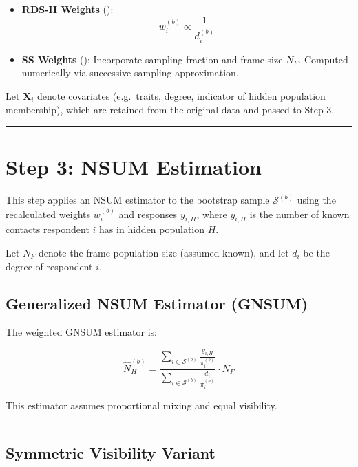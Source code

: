 \documentclass[
  12pt,
  letterpaper,
  DIV=11,
  numbers=noendperiod]{scrartcl}
\theoremstyle{plain}
\theoremstyle{definition}
\begin{document}
\begin{itemize}
\item
  \textbf{RDS-II Weights} (\textcite{volz08-simple}): \[
  w_i^{(b)} \propto \frac{1}{d_i^{(b)}}
  \]
\item
  \textbf{SS Weights} (\textcite{gile11-improv}): Incorporate sampling
  fraction and frame size \(N_F\). Computed numerically via successive
  sampling approximation.
\end{itemize}

Let \(\mathbf{X}_i\) denote covariates (e.g.~traits, degree, indicator
of hidden population membership), which are retained from the original
data and passed to Step 3.

\begin{center}\rule{0.5\linewidth}{0.5pt}\end{center}

\section{Step 3: NSUM Estimation}\label{step-3-nsum-estimation}

This step applies an NSUM estimator to the bootstrap sample
\(\mathcal{S}^{(b)}\) using the recalculated weights \(w_i^{(b)}\) and
responses \(y_{i,H}\), where \(y_{i,H}\) is the number of known contacts
respondent \(i\) has in hidden population \(H\).

Let \(N_F\) denote the frame population size (assumed known), and let
\(d_i\) be the degree of respondent \(i\).

\subsection{Generalized NSUM Estimator
(GNSUM)}\label{generalized-nsum-estimator-gnsum}

The weighted GNSUM estimator is:

\[
\hat{N}_H^{(b)} = \frac{\sum_{i \in \mathcal{S}^{(b)}} \frac{y_{i,H}}{\pi_i^{(b)}}}{\sum_{i \in \mathcal{S}^{(b)}} \frac{d_i}{\pi_i^{(b)}}} \cdot N_F
\]

This estimator assumes proportional mixing and equal visibility.

\begin{center}\rule{0.5\linewidth}{0.5pt}\end{center}

\subsection{Symmetric Visibility
Variant}\label{symmetric-visibility-variant}
\end{document}
